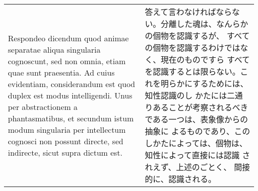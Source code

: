\documentclass[10pt]{jsarticle} %
\begin{document}
\begin{longtable}{p{21em}p{21em}}
\\



{\sc Respondeo dicendum} quod animae separatae aliqua singularia
cognoscunt, sed non omnia, etiam quae sunt praesentia. Ad cuius
evidentiam, considerandum est quod duplex est modus intelligendi. Unus
per abstractionem a phantasmatibus, et secundum istum modum singularia
per intellectum cognosci non possunt directe, sed indirecte, sicut
supra dictum est.


&

答えて言わなければならない。分離した魂は、なんらかの個物を認識するが、
すべての個物を認識するわけではなく、現在のものですら
すべてを認識するとは限らない。これを明らかにするためには、知性認識のし
かたには二通りあることが考察されるべきである一つは、表象像からの抽象に
よるものであり、このしかたによっては、個物は、知性によって直接には認識
されえず、上述のごとく、
間接的に、認識される。



\end{longtable}
\end{document}
